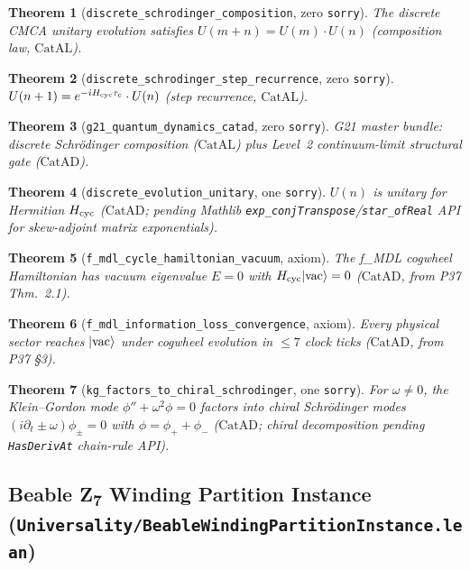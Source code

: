 \documentclass[11pt,a4paper]{article}
\newtheorem{theorem}{Theorem}[section]
\theoremstyle{definition}
\newcommand{\CatAL}{\ensuremath{\mathrm{CatAL}}}
\newcommand{\CatAD}{\ensuremath{\mathrm{CatAD}}}
\begin{document}
\begin{theorem}[\lstinline|discrete_schrodinger_composition|, zero \texttt{sorry}]
The discrete CMCA unitary evolution satisfies $U(m+n) = U(m) \cdot U(n)$ (composition law, $\CatAL$).
\end{theorem}

\begin{theorem}[\lstinline|discrete_schrodinger_step_recurrence|, zero \texttt{sorry}]
$U(n+1) = e^{-iH_{\rm cyc}\tau_c} \cdot U(n)$ (step recurrence, $\CatAL$).
\end{theorem}

\begin{theorem}[\lstinline|g21_quantum_dynamics_catad|, zero \texttt{sorry}]
G21 master bundle: discrete Schr\"odinger composition ($\CatAL$) plus Level~2
continuum-limit structural gate ($\CatAD$).
\end{theorem}

\begin{theorem}[\lstinline|discrete_evolution_unitary|, one \texttt{sorry}]
$U(n)$ is unitary for Hermitian $H_{\rm cyc}$ ($\CatAD$; pending Mathlib
\texttt{exp\_conjTranspose}/\texttt{star\_ofReal} API for skew-adjoint matrix
exponentials).
\end{theorem}

\begin{theorem}[\lstinline|f_mdl_cycle_hamiltonian_vacuum|, axiom]
The f\_MDL cogwheel Hamiltonian has vacuum eigenvalue $E=0$ with
$H_{\rm cyc}|{\rm vac}\rangle=0$ ($\CatAD$, from P37 Thm.~2.1).
\end{theorem}

\begin{theorem}[\lstinline|f_mdl_information_loss_convergence|, axiom]
Every physical sector reaches $|{\rm vac}\rangle$ under cogwheel evolution in
$\leq 7$ clock ticks ($\CatAD$, from P37 \S3).
\end{theorem}

\begin{theorem}[\lstinline|kg_factors_to_chiral_schrodinger|, one \texttt{sorry}]
For $\omega \neq 0$, the Klein--Gordon mode $\phi''+\omega^2\phi=0$ factors into chiral Schr\"odinger modes $(i\partial_t \pm \omega)\phi_\pm=0$ with $\phi=\phi_++\phi_-$ ($\CatAD$; chiral decomposition pending \texttt{HasDerivAt} chain-rule API).
\end{theorem}

\subsection{Beable Z\textsubscript{7} Winding Partition Instance\linebreak
  (\texttt{\small Universality/BeableWindingPartitionInstance.lean})}\label{subsec:beable-winding-partition}
\end{document}
